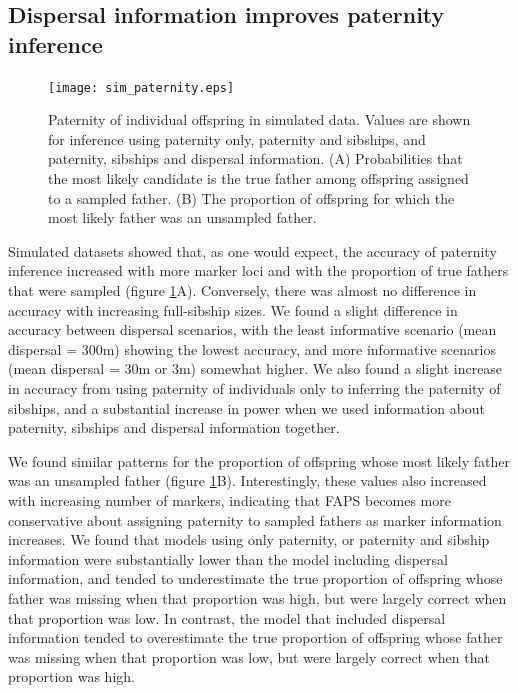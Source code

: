 \documentclass[10pt, a4paper, twocolumn]{article} %
\begin{document}
\subsection{Dispersal information improves paternity inference}

\begin{figure}
    \centering
    \texttt{[image: sim\_paternity.eps]}
    \caption{
        Paternity of individual offspring in simulated data.
        Values are shown for inference using paternity only, paternity and sibships, and paternity, sibships and dispersal information.
        (A) Probabilities that the most likely candidate is the true father among offspring assigned to a sampled father.
        (B) The proportion of offspring for which the most likely father was an unsampled father.
    }
    \label{fig:sim-paternity}
\end{figure}

Simulated datasets showed that, as one would expect, the accuracy of paternity inference increased with more marker loci and with the proportion of true fathers that were sampled (figure \ref{fig:sim-paternity}A).
Conversely, there was almost no difference in accuracy with increasing full-sibship sizes.
We found a slight difference in accuracy between dispersal scenarios, with the least informative scenario (mean dispersal = 300m) showing the lowest accuracy, and more informative scenarios (mean dispersal = 30m or 3m) somewhat higher.
We also found a slight increase in accuracy from using paternity of individuals only to inferring the paternity of sibships, and a substantial increase in power when we used information about paternity, sibships and dispersal information together. 

We found similar patterns for the proportion of offspring whose most likely father was an unsampled father (figure \ref{fig:sim-paternity}B).
Interestingly, these values also increased with increasing number of markers, indicating that FAPS becomes more conservative about assigning paternity to sampled fathers as marker information increases.
We found that models using only paternity, or paternity and sibship information were substantially lower than the model including dispersal information, and tended to underestimate the true proportion of offspring whose father was missing when that proportion was high, but were largely correct when that proportion was low.
In contrast, the model that included dispersal information tended to overestimate the true proportion of offspring whose father was missing when that proportion was low, but were largely correct when that proportion was high.
\end{document}
